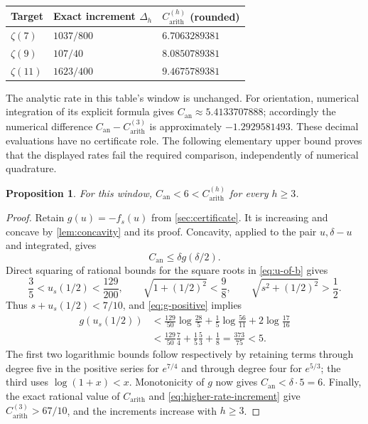 \documentclass[11pt,letterpaper]{article}
\newtheorem{proposition}[proposition]{Proposition}
\theoremstyle{definition}
\newcommand{\arith}{\mathrm{arith}}
\newcommand{\an}{\mathrm{an}}
\begin{document}
\begin{center}
\begin{tabular}{@{}lll@{}}
\toprule
Target & Exact increment $\Delta_h$ & $C_{\arith}^{(h)}$ (rounded)\\
\midrule
$\zeta(7)$  & $1037/800$ & $6.7063289381$\\
$\zeta(9)$  & $107/40$   & $8.0850789381$\\
$\zeta(11)$ & $1623/400$ & $9.4675789381$\\
\bottomrule
\end{tabular}
\end{center}

The analytic rate in this table's window is unchanged. For orientation,
numerical integration of its explicit formula gives
$C_{\an}\approx5.4133707888$; accordingly the numerical difference
$C_{\an}-C_{\arith}^{(3)}$ is approximately $-1.2929581493$.
These decimal evaluations have no certificate role. The following
elementary upper bound proves that the displayed rates fail the
required comparison, independently of numerical quadrature.

\begin{proposition}\label{prop:higher-window-failure}
For this window, $C_{\an}<6<C_{\arith}^{(h)}$ for every $h\ge3$.
\end{proposition}
\begin{proof}
Retain $g(u)=-f_s(u)$ from \cref{sec:certificate}. It is increasing
and concave by \cref{lem:concavity} and its proof. Concavity, applied
to the pair $u,\delta-u$ and integrated, gives
\[
 C_{\an}\le\delta g(\delta/2).
\]
Direct squaring of rational bounds for the square roots in
\eqref{eq:u-of-b} gives
\[
 \frac35<u_s(1/2)<\frac{129}{200},\qquad
 \sqrt{1+(1/2)^2}<\frac98,\qquad
 \sqrt{s^2+(1/2)^2}>\frac12.
\]
Thus $s+u_s(1/2)<7/10$, and \eqref{eq:g-positive} implies
\begin{align*}
 g(u_s(1/2))
 &<\frac{129}{50}\log\frac{28}{5}
      +\frac15\log\frac{56}{11}+2\log\frac{17}{16}\\
 &<\frac{129}{50}\frac74+\frac15\frac53+\frac18
   =\frac{373}{75}<5.
\end{align*}
The first two logarithmic bounds follow respectively by retaining
terms through degree five in the positive series for $e^{7/4}$ and
through degree four for $e^{5/3}$; the third uses $\log(1+x)<x$.
Monotonicity of $g$ now gives $C_{\an}<\delta\cdot5=6$.
Finally, the exact rational value of $C_{\arith}$ and
\eqref{eq:higher-rate-increment} give
$C_{\arith}^{(3)}>67/10$, and the increments increase with $h\ge3$.
\end{proof}
\end{document}
